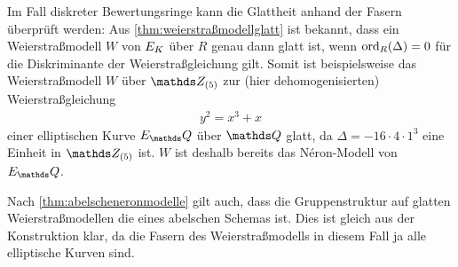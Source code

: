 \begin{Bemerkung}
  Im Fall diskreter Bewertungsringe kann die Glattheit anhand der Fasern
  überprüft werden:
  Aus \ref{thm:weierstraßmodellglatt} ist bekannt,
  dass ein Weierstraßmodell $W$ von $E_{K}$ über $R$ genau dann glatt
  ist, wenn $\operatorname{ord}_R(\Delta)=0$ für die Diskriminante der
  Weierstraßgleichung gilt.
  Somit ist beispielsweise das Weierstraßmodell $W$ über $\Z_{(5)}$
  zur (hier dehomogenisierten) Weierstraßgleichung
  \begin{gather*}
    y^2=x^3+x
  \end{gather*}
  einer elliptischen Kurve $E_\Q$ über $\Q$ glatt, da
  $\Delta=-16\cdot4\cdot1^3$ eine Einheit in $\Z_{(5)}$ ist.
  $W$ ist deshalb bereits das Néron-Modell von $E_\Q$.

  Nach \ref{thm:abelscheneronmodelle} gilt auch, dass die
  Gruppenstruktur auf glatten Weierstraßmodellen die eines abelschen
  Schemas ist.
  Dies ist gleich aus der Konstruktion klar, da die Fasern des
  Weierstraßmodells in diesem Fall ja alle elliptische Kurven sind.
\end{Bemerkung}

